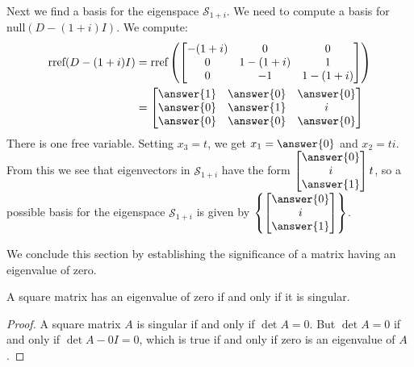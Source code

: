 \documentclass{ximera}
\begin{document}
\begin{example}
\begin{explanation}
        Next we find a basis for the eigenspace $\mathcal{S}_{1+i}$.  We need to compute a basis for $\mbox{null}(D-(1+i)I)$.  We compute:
        \begin{align*}
        \mbox{rref}(D-(1+i)I) &= \mbox{rref}\left(\begin{bmatrix} -(1+i)&0&0\\ 0 &1-(1+i)&1\\ 0 & -1&1-(1+i)\end{bmatrix}\right) \\
        &= \begin{bmatrix} \answer{1} & \answer{0} &\answer{0}\\ \answer{0} & \answer{1} & i\\ \answer{0} & \answer{0} & \answer{0}\end{bmatrix}
        \end{align*}
        There is one free variable.  Setting $x_3=t$, we get $x_1=\answer{0}$ and $x_2=ti$.  From this we see that eigenvectors in $\mathcal{S}_{1+i}$ have the form $\begin{bmatrix}\answer{0}\\i\\\answer{1}\end{bmatrix}t$, so a possible basis for the eigenspace $\mathcal{S}_{1+i}$ is given by $\left\{\begin{bmatrix}\answer{0}\\i\\\answer{1}\end{bmatrix}\right\}$.
        \end{explanation}
        \end{example}
    
We conclude this section by establishing the significance of a matrix having an eigenvalue of zero.
    
\begin{theorem}\label{th:zero_ew}
A square matrix has an eigenvalue of zero if and only if it is singular.
\end{theorem}
    
\begin{proof}
A square matrix $A$ is singular if and only if $\det{A}=0$.  But $\det{A}=0$ if and only if $\det{A-0I}=0$, which is true if and only if zero is an eigenvalue of $A$.
\end{proof}

    
\end{document}
